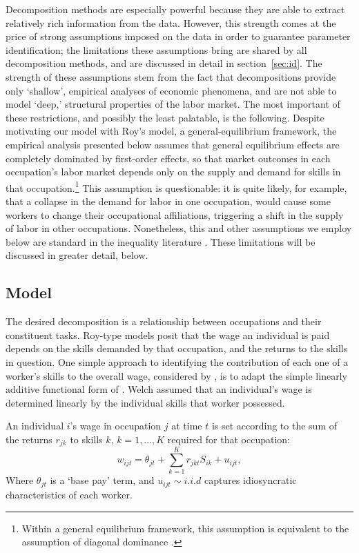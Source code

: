 Decomposition methods are especially powerful because they are able to extract relatively rich information from the data. However, this strength comes at the price of strong assumptions imposed on the data in order to guarantee parameter identification; the limitations these assumptions bring are shared by all decomposition methods, and are discussed in detail in section~\ref{sec:id}. The strength of these assumptions stem from the fact that decompositions provide only `shallow', empirical analyses of economic phenomena, and are not able to model `deep,' structural properties of the labor market. The most important of these restrictions, and possibly the least palatable, is the following. Despite motivating our model with Roy's model, a general-equilibrium framework, the empirical analysis presented below assumes that general equilibrium effects are completely dominated by first-order effects, so that market outcomes in each occupation's labor market depends only on the supply and demand for skills in that occupation.\footnote{Within a general equilibrium framework, this assumption is equivalent to the assumption of diagonal dominance \citep[p.233]{Arrow1971}.} This assumption is questionable: it is quite likely, for example, that a collapse in the demand for labor in one occupation, would cause some workers to change their occupational affiliations, triggering a shift in the supply of labor in other occupations. Nonetheless, this and other assumptions we employ below are standard in the inequality literature \citep[p.1]{Fortin2011}. These limitations will be discussed in greater detail, below.

\subsection{Model}

The desired decomposition is a relationship between occupations and their constituent tasks. Roy-type models posit that the wage an individual is paid depends on the skills demanded by that occupation, and the returns to the skills in question. One simple approach to identifying the contribution of each one of a worker's skills to the overall wage, considered by \citet{Firpo2011}, is to adapt the simple linearly additive functional form of \citet{Welch1969}. Welch assumed that an individual's wage is determined linearly by the individual skills that worker possessed.
\begin{assumption} \label{ass:linear}
  An individual $i$'s wage in occupation $j$ at time $t$ is set according to the sum of the returns $r_{jk}$ to skills $k$, $k=1,\dots,K$ required for that occupation:
\begin{equation}
  w_{ijt} = \theta_{jt} + \sum_{k=1}^K r_{jkt}S_{ik} + u_{ijt}, \label{eq:linear}
\end{equation}
Where $\theta_{jt}$ is a `base pay' term, and $u_{ijt}\sim i.i.d$ captures idiosyncratic characteristics of each worker. 
\end{assumption}

